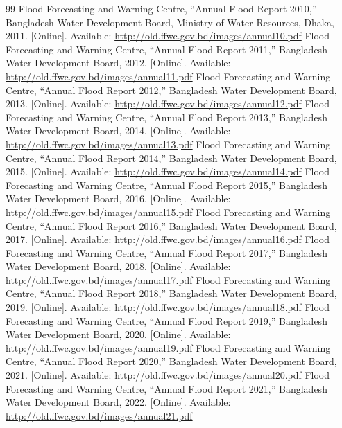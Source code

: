 \documentclass[5p,twocolumn]{elsarticle}
\begin{document}
\begin{thebibliography}{99}
 Flood Forecasting and Warning Centre, ``Annual Flood Report 2010,'' Bangladesh Water Development Board, Ministry of Water Resources, Dhaka, 2011. [Online]. Available: \url{http://old.ffwc.gov.bd/images/annual10.pdf}
 Flood Forecasting and Warning Centre, ``Annual Flood Report 2011,'' Bangladesh Water Development Board, 2012. [Online]. Available: \url{http://old.ffwc.gov.bd/images/annual11.pdf}
 Flood Forecasting and Warning Centre, ``Annual Flood Report 2012,'' Bangladesh Water Development Board, 2013. [Online]. Available: \url{http://old.ffwc.gov.bd/images/annual12.pdf}
 Flood Forecasting and Warning Centre, ``Annual Flood Report 2013,'' Bangladesh Water Development Board, 2014. [Online]. Available: \url{http://old.ffwc.gov.bd/images/annual13.pdf}
 Flood Forecasting and Warning Centre, ``Annual Flood Report 2014,'' Bangladesh Water Development Board, 2015. [Online]. Available: \url{http://old.ffwc.gov.bd/images/annual14.pdf}
 Flood Forecasting and Warning Centre, ``Annual Flood Report 2015,'' Bangladesh Water Development Board, 2016. [Online]. Available: \url{http://old.ffwc.gov.bd/images/annual15.pdf}
 Flood Forecasting and Warning Centre, ``Annual Flood Report 2016,'' Bangladesh Water Development Board, 2017. [Online]. Available: \url{http://old.ffwc.gov.bd/images/annual16.pdf}
 Flood Forecasting and Warning Centre, ``Annual Flood Report 2017,'' Bangladesh Water Development Board, 2018. [Online]. Available: \url{http://old.ffwc.gov.bd/images/annual17.pdf}
 Flood Forecasting and Warning Centre, ``Annual Flood Report 2018,'' Bangladesh Water Development Board, 2019. [Online]. Available: \url{http://old.ffwc.gov.bd/images/annual18.pdf}
 Flood Forecasting and Warning Centre, ``Annual Flood Report 2019,'' Bangladesh Water Development Board, 2020. [Online]. Available: \url{http://old.ffwc.gov.bd/images/annual19.pdf}
 Flood Forecasting and Warning Centre, ``Annual Flood Report 2020,'' Bangladesh Water Development Board, 2021. [Online]. Available: \url{http://old.ffwc.gov.bd/images/annual20.pdf}
 Flood Forecasting and Warning Centre, ``Annual Flood Report 2021,'' Bangladesh Water Development Board, 2022. [Online]. Available: \url{http://old.ffwc.gov.bd/images/annual21.pdf}

\end{thebibliography}
\end{document}
